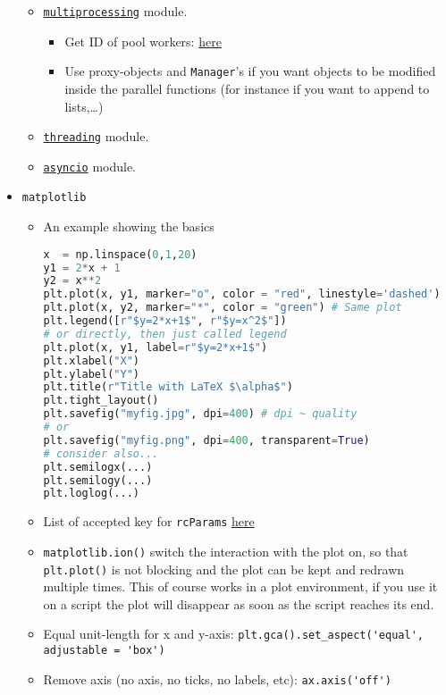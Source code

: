 \documentclass[a4paper,12pt,%
              final%
              ]{article}
\begin{document}
\begin{itemize}
\begin{itemize}
      \item \href{https://docs.python.org/3/library/multiprocessing.html}{\texttt{multiprocessing}} module.
        \begin{itemize}
          \item Get ID of pool workers: \href{https://stackoverflow.com/questions/10190981/get-a-unique-id-for-worker-in-python-multiprocessing-pool}{here}
          \item Use proxy-objects and \texttt{Manager}'s if you want objects to be modified inside the parallel functions (for instance if you want to append to lists,\ldots)
        \end{itemize}
      \item \href{https://docs.python.org/3/library/threading.html}{\texttt{threading}} module.
      \item \href{https://docs.python.org/3/library/asyncio.html}{\texttt{asyncio}} module.
    \end{itemize}
  \item \texttt{matplotlib}
    \begin{itemize}
      \item An example showing the basics
\begin{lstlisting}[language=python]
x  = np.linspace(0,1,20)
y1 = 2*x + 1
y2 = x**2
plt.plot(x, y1, marker="o", color = "red", linestyle='dashed')
plt.plot(x, y2, marker="*", color = "green") # Same plot
plt.legend([r"$y=2*x+1$", r"$y=x^2$"])
# or directly, then just called legend
plt.plot(x, y1, label=r"$y=2*x+1$")
plt.xlabel("X")
plt.ylabel("Y")
plt.title(r"Title with LaTeX $\alpha$")
plt.tight_layout()
plt.savefig("myfig.jpg", dpi=400) # dpi ~ quality
# or
plt.savefig("myfig.png", dpi=400, transparent=True)
# consider also...
plt.semilogx(...)
plt.semilogy(...)
plt.loglog(...)
\end{lstlisting}
      \item List of accepted key for \texttt{rcParams} \href{https://matplotlib.org/stable/api/matplotlib_configuration_api.html#matplotlib.rcParams}{here}
      \item \texttt{matplotlib.ion()} switch the interaction with the plot on, so that \texttt{plt.plot()} is not blocking and the plot can be kept and redrawn multiple times. This of course works in a plot environment, if you use it on a script the plot will disappear as soon as the script reaches its end.
      \item Equal unit-length for x and y-axis: \verb|plt.gca().set_aspect('equal', adjustable = 'box')|
      \item Remove axis (no axis, no ticks, no labels, etc): \verb|ax.axis('off')|

\end{itemize}
\end{itemize}
\end{document}
